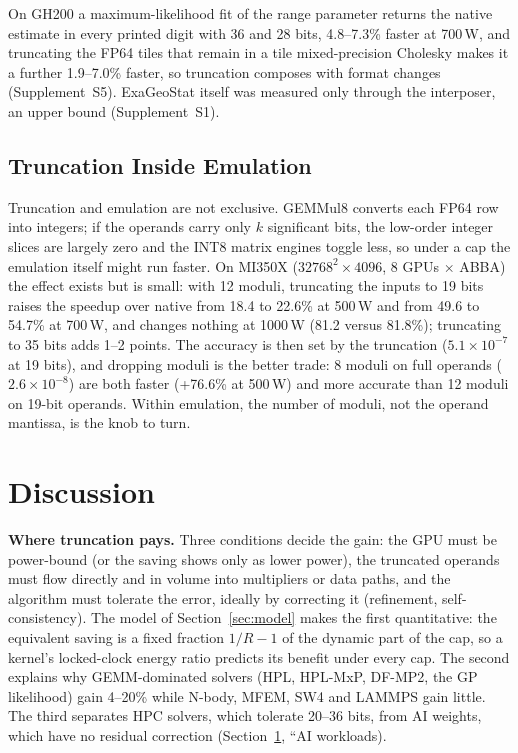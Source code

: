 \documentclass[conference]{IEEEtran}
\newcommand{\W}{\,W}
\newcommand{\ee}[2]{#1{\times}10^{#2}}  %
\newcommand{\pct}{\%}
\begin{document}
On GH200 a maximum-likelihood fit of the range parameter returns the native estimate in every printed digit with 36
and 28 bits, 4.8--7.3\pct{} faster at 700\W, and truncating the FP64 tiles that remain in a tile mixed-precision
Cholesky makes it a further 1.9--7.0\pct{} faster, so truncation composes with format changes (Supplement~S5).
ExaGeoStat itself was measured only through the interposer, an upper bound (Supplement~S1).

\subsection{Truncation Inside Emulation}\label{sec:synergy}

Truncation and emulation are not exclusive. GEMMul8 converts each FP64 row into integers; if the operands carry only
$k$ significant bits, the low-order integer slices are largely zero and the INT8 matrix engines toggle less, so under a cap
the emulation itself might run faster. On MI350X ($32768^2\times4096$, 8 GPUs $\times$ ABBA) the effect exists but is
small: with 12 moduli, truncating the inputs to 19 bits raises the speedup over native from 18.4 to 22.6\pct{} at 500\W{}
and from 49.6 to 54.7\pct{} at 700\W, and changes nothing at 1000\W{} (81.2 versus 81.8\pct); truncating to 35 bits adds
1--2 points. The accuracy is then set by the truncation ($\ee{5.1}{-7}$ at 19 bits), and dropping moduli is the better
trade: 8 moduli on full operands ($\ee{2.6}{-8}$) are both faster (+76.6\pct{} at 500\W) and more accurate than 12
moduli on 19-bit operands. Within emulation, the number of moduli, not the operand mantissa, is the knob to turn.


\section{Discussion}\label{sec:discussion}

\textbf{Where truncation pays.} Three conditions decide the gain: the GPU must be power-bound (or the saving shows
only as lower power), the truncated operands must flow directly and in volume into multipliers or data paths, and the
algorithm must tolerate the error, ideally by correcting it (refinement, self-consistency). The model of
Section~\ref{sec:model} makes the first quantitative: the equivalent saving is a fixed fraction $1/R-1$ of the dynamic
part of the cap, so a kernel's locked-clock energy ratio predicts its benefit under every cap. The second explains why
GEMM-dominated solvers (HPL, HPL-MxP, DF-MP2, the GP likelihood) gain 4--20\pct{} while N-body, MFEM, SW4 and LAMMPS gain
little. The third separates HPC solvers, which tolerate 20--36 bits, from AI weights, which have no residual correction
(Section~\ref{sec:discussion}, ``AI workloads).
\end{document}
